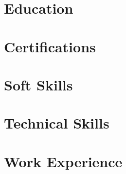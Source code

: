 \documentclass[letter,10pt]{article}
\begin{document}


\section{Education}


\section{Certifications}


\section{Soft Skills}


\section{Technical Skills}


\section{Work Experience}



% 
\end{document}
